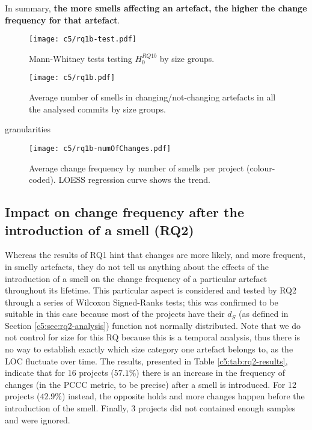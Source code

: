 In summary, \textbf{the more smells affecting an artefact, the higher the change frequency for that artefact}. 

\begin{figure}
    \centering
    \texttt{[image: c5/rq1b-test.pdf]}
    \caption{Mann-Whitney tests testing $H^{RQ1b}_0$ by size groups.} \label{c5:fig:rq1b-test}
\end{figure}

\begin{figure}
    \centering
    \texttt{[image: c5/rq1b.pdf]}
    \caption{Average number of smells in changing/not-changing artefacts in all the analysed commits by size groups.} \label{c5:fig:rq1b-density}
\end{figure}
granularities
\begin{figure}%
    \centering
    \texttt{[image: c5/rq1b-numOfChanges.pdf]}
    \caption{Average change frequency by number of smells per project (colour-coded). LOESS regression curve shows the trend.}%
    \label{c5:fig:rq1b-numsmells-size-freq}%
\end{figure}

\subsection{Impact on change frequency after the introduction of a smell (RQ2)}
Whereas the results of RQ1 hint that changes are more likely, and more frequent, in smelly artefacts, they do not tell us anything about the effects of the introduction of a smell on the change frequency of a particular artefact throughout its lifetime.
This particular aspect is considered and tested by RQ2 through a series of Wilcoxon Signed-Ranks tests; this was confirmed to be suitable in this case because most of the projects have their $d_S$  (as defined in Section \ref{c5:sec:rq2-analysis}) function not normally distributed.
Note that we do not control for size for this RQ because this is a temporal analysis, thus there is no way to establish exactly which size category one artefact belongs to, as the LOC fluctuate over time.
The results, presented in Table \ref{c5:tab:rq2-results}, indicate that for 16 projects ($57.1\%$) there is an increase in the frequency of changes (in the PCCC metric, to be precise) after a smell is introduced. For 12 projects ($42.9\%$) instead, the opposite holds and more changes happen before the introduction of the smell. Finally, 3 projects did not contained enough samples and were ignored.


